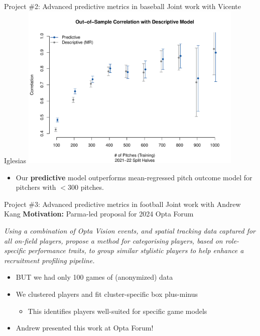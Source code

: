 \documentclass[handout]{beamer}
\begin{document}
\begin{frame}{Project \#2: Advanced predictive metrics in baseball}
  {Joint work with Vicente Iglesias}
  \centering
  \includegraphics[width = 0.8\textwidth]{images/cor_by_sample_size.pdf}
  \begin{itemize}
    \item Our {\bf predictive} model outperforms mean-regressed pitch outcome model for pitchers with $< 300$ pitches.
  \end{itemize}
\end{frame}
 

\begin{frame}{Project \#3: Advanced predictive metrics in football}
  {Joint work with Andrew Kang}
  {\bf Motivation:} Parma-led proposal for 2024 Opta Forum
  \begin{framed}
    \small\it
    Using a combination of Opta Vision events, and spatial tracking data captured for all on-field players, propose a method for categorising players, based on role-specific performance traits, to group similar stylistic players to help enhance a recruitment profiling pipeline. 
  \end{framed}
  \begin{itemize}
    \item BUT we had only 100 games of (anonymized) data
    \item We clustered players and fit cluster-specific box plus-minus
    \begin{itemize}
      \item This identifies players well-suited for specific game models
    \end{itemize}
    \item Andrew presented this work at Opta Forum!
  \end{itemize}
\end{frame}
\end{document}
